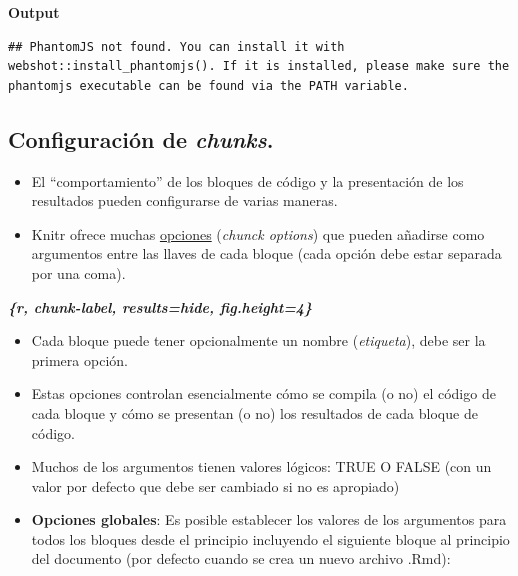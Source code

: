 \documentclass[
]{article}
\newenvironment{Shaded}{\begin{snugshade}}{\end{snugshade}}
\newcommand{\InformationTok}[1]{\textcolor[rgb]{0.56,0.35,0.01}{\textbf{\textit{#1}}}}
\begin{document}
\textbf{Output}

\begin{verbatim}
## PhantomJS not found. You can install it with webshot::install_phantomjs(). If it is installed, please make sure the phantomjs executable can be found via the PATH variable.
\end{verbatim}

\hypertarget{configuraciuxf3n-de-chunks.}{%
\subsection{\texorpdfstring{Configuración de
\emph{chunks}.}{Configuración de chunks.}}\label{configuraciuxf3n-de-chunks.}}

\begin{itemize}
\item
  El ``comportamiento'' de los bloques de código y la presentación de
  los resultados pueden configurarse de varias maneras.
\item
  Knitr ofrece muchas
  \href{https://rstudio.com/wp-content/uploads/2015/03/rmarkdown-reference.pdf}{opciones}
  (\emph{chunck options}) que pueden añadirse como argumentos entre las
  llaves de cada bloque (cada opción debe estar separada por una coma).
\end{itemize}

\begin{Shaded}
\begin{Highlighting}[]
\InformationTok{\textasciigrave{}\textasciigrave{}\textasciigrave{}\{r, chunk{-}label, results=\textquotesingle{}hide\textquotesingle{}, fig.height=4\}}
\InformationTok{\textasciigrave{}\textasciigrave{}\textasciigrave{}}
\end{Highlighting}
\end{Shaded}

\begin{itemize}
\item
  Cada bloque puede tener opcionalmente un nombre (\emph{etiqueta}),
  debe ser la primera opción.
\item
  Estas opciones controlan esencialmente cómo se compila (o no) el
  código de cada bloque y cómo se presentan (o no) los resultados de
  cada bloque de código.
\item
  Muchos de los argumentos tienen valores lógicos: TRUE O FALSE (con un
  valor por defecto que debe ser cambiado si no es apropiado)
\item
  \textbf{Opciones globales}: Es posible establecer los valores de los
  argumentos para todos los bloques desde el principio incluyendo el
  siguiente bloque al principio del documento (por defecto cuando se
  crea un nuevo archivo .Rmd):
\end{itemize}
\end{document}
